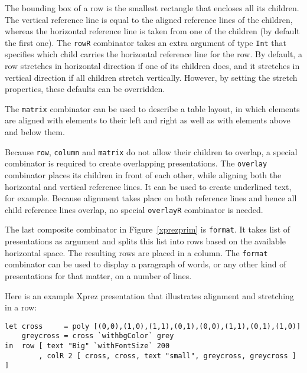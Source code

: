 \begin{center}
\end{center}

The bounding box of a row is the smallest rectangle that encloses all its children. The vertical reference line is equal to the aligned reference lines of the children, whereas the horizontal reference line is taken from one of the children (by default the first one). The \texttt{rowR} combinator takes an extra argument of type \texttt{Int} that specifies which child carries the horizontal reference line for the row. \texttt{}By default, a row stretches in horizontal direction if one of its children does, and it stretches in vertical direction if all children stretch vertically. However, by setting the stretch properties, these defaults can be overridden. 

The \texttt{matrix} combinator can be used to describe a table layout, in which elements are aligned with elements to their left and right as well as with elements above and below them. 

Because \texttt{row}, \texttt{column} and \texttt{matrix} do not allow their children to overlap, a special combinator is required to create overlapping presentations. The \texttt{overlay} combinator places its children in front of each other, while aligning both the horizontal and vertical reference lines. It can be used to create underlined text, for example. Because alignment takes place on both reference lines and hence all child reference lines overlap, no special \texttt{overlayR} combinator is needed. 

The last composite combinator in Figure~\ref{xprezprim} is \texttt{format}. It takes list of presentations as argument and splits this list into rows based on the available horizontal space. The resulting rows are placed in a column. The \texttt{format} combinator can be used to display a paragraph of words, or any other kind of presentations for that matter, on a number of lines. 

\fromHere

Here is an example {\sc Xprez} presentation that illustrates alignment and stretching in a row:

\begin{small}
\begin{verbatim}
let cross     = poly [(0,0),(1,0),(1,1),(0,1),(0,0),(1,1),(0,1),(1,0)]
    greycross = cross `withbgColor` grey
in  row [ text "Big" `withFontSize` 200
        , colR 2 [ cross, cross, text "small", greycross, greycross ] ] 
\end{verbatim}
\end{small}


